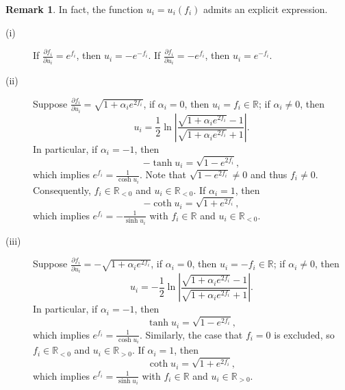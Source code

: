 \documentclass[12pt]{amsart}
\theoremstyle{definition}
\newtheorem{remark}[theorem]{Remark}
\begin{document}
\begin{remark}\label{Rmk: 2}
In fact, the function $u_i=u_i(f_i)$ admits an explicit expression.
\begin{description}
\item[(i)] 
If $\frac{\partial f_i}{\partial u_i}=e^{f_i}$, then $u_i=-e^{-f_i}$.
If $\frac{\partial f_i}{\partial u_i}=-e^{f_i}$,
then $u_i=e^{-f_i}$.

\item[(ii)]
Suppose $\frac{\partial f_i}{\partial u_i}=\sqrt{1+\alpha_ie^{2f_i}}$,
if $\alpha_i=0$, then $u_i=f_i\in \mathbb{R}$;
if $\alpha_i\neq0$, then
\begin{equation*}
u_i=\frac{1}{2}\ln\left|\frac{\sqrt{1+\alpha_ie^{2f_i}}-1}
{\sqrt{1+\alpha_ie^{2f_i}}+1}\right|.
\end{equation*}
In particular, if $\alpha_i=-1$, then
\begin{equation}\label{Eq: F33}
-\tanh u_i=\sqrt{1-e^{2f_i}},
\end{equation}
which implies $e^{f_i}=\frac{1}{\cosh u_i}$.
Note that $\sqrt{1-e^{2f_i}}\neq0$ and thus $f_i\neq0$.
Consequently, $f_i\in \mathbb{R}_{<0}$ and $u_i\in \mathbb{R}_{<0}$.
If $\alpha_i=1$, then
\begin{equation}\label{Eq: F34}
-\coth u_i=\sqrt{1+e^{2f_i}},
\end{equation}
which implies $e^{f_i}=-\frac{1}{\sinh u_i}$ with $f_i\in \mathbb{R}$ and $u_i\in \mathbb{R}_{<0}$.

\item[(iii)]
Suppose $\frac{\partial f_i}{\partial u_i}=-\sqrt{1+\alpha_ie^{2f_i}}$,
if $\alpha_i=0$, then $u_i=-f_i\in \mathbb{R}$;
if $\alpha_i\neq0$, then
\begin{equation*}
u_i=-\frac{1}{2}\ln\left|\frac{\sqrt{1+\alpha_ie^{2f_i}}-1}
{\sqrt{1+\alpha_ie^{2f_i}}+1}\right|.
\end{equation*}
In particular, if $\alpha_i=-1$, then
\begin{equation*}
\tanh u_i=\sqrt{1-e^{2f_i}},
\end{equation*}
which implies $e^{f_i}=\frac{1}{\cosh u_i}$.
Similarly, the case that $f_i=0$ is excluded,
so $f_i\in \mathbb{R}_{<0}$ and $u_i\in \mathbb{R}_{>0}$.
If $\alpha_i=1$, then
\begin{equation*}
\coth u_i=\sqrt{1+e^{2f_i}},
\end{equation*}
which implies $e^{f_i}=\frac{1}{\sinh u_i}$ with $f_i\in \mathbb{R}$ and $u_i\in \mathbb{R}_{>0}$.


\end{description}
\end{remark}
\end{document}
